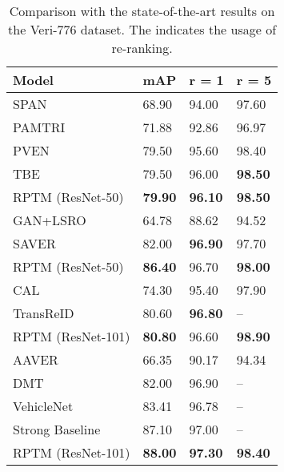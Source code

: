 \documentclass[10pt,twocolumn,letterpaper]{article}
\begin{document}
\begin{table}[h]
\small
\begin{center}
\centering
\begin{tabular}{P{3.4cm}|P{1cm}|P{1cm}|P{1cm}  }
 \hline

 \hline
 Model& mAP &r = 1&r = 5\\
 \hline
 \hline
 
 SPAN~\cite{chen2020orientation}& 68.90	& 94.00	& 97.60\\
 PAMTRI~\cite{tang2019pamtri} & 71.88	& 92.86	& 96.97\\
 PVEN~\cite{meng2020parsing} & 79.50 & 95.60 & 98.40\\
 TBE~\cite{sun2021tbe} & 79.50 & 96.00 & \textbf{98.50}\\
 \hline
 RPTM (ResNet-50) & \textbf{79.90} & \textbf{96.10} & \textbf{98.50}\\
 \hline
 GAN+LSRO~\cite{wu2018joint} & 64.78 &88.62 & 94.52\\
 SAVER~\cite{khorramshahi2020devil} & 82.00 & \textbf{96.90} & 97.70\\
\hline
 RPTM (ResNet-50)  & \textbf{86.40} & 96.70 & \textbf{98.00}\\
 \hline



CAL~\cite{rao2021counterfactual} & 74.30 & 95.40 & 97.90\\
TransReID~\cite{he2021transreid} & 80.60 &\textbf{96.80} & --\\
 \hline
 RPTM (ResNet-101) & \textbf{80.80} & 96.60 & \textbf{98.90}\\
 \hline
AAVER~\cite{khorramshahi2019dual} &66.35&	90.17&	94.34\\
DMT~\cite{he2020multi} & 82.00 & 96.90 & --\\
VehicleNet~\cite{zheng2020vehiclenet} & 83.41 & 96.78 & --\\
Strong Baseline~\cite{huynh2021strong} & 87.10 & 97.00 & --\\
\hline
 RPTM (ResNet-101)  & \textbf{88.00} & \textbf{97.30} & \textbf{98.40}\\
 \hline


 


 


\end{tabular}
\end{center}

\caption{Comparison with the state-of-the-art results on the Veri-776 dataset. The  indicates the usage of re-ranking.}
\label{tab:veri}
\end{table}
\end{document}
